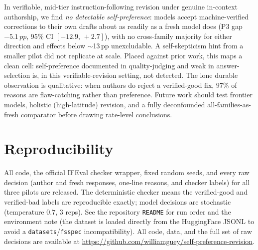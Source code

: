 \documentclass[11pt]{article}
\newcommand{\pp}{\,pp}
\newcommand{\CI}[2]{$[#1,\,#2]$}
\begin{document}
In verifiable, mid-tier instruction-following revision under genuine in-context authorship, we find
\emph{no detectable self-preference}: models accept machine-verified corrections to their own drafts
about as readily as a fresh model does (P3 gap $-5.1\pp$, 95\% CI \CI{-12.9}{+2.7}), with no
cross-family majority for either direction and effects below $\sim$13\pp{} unexcludable. A
self-skepticism hint from a smaller pilot did not replicate at scale. Placed against prior work, this
maps a clean cell: self-preference documented in quality-judging and weak in answer-selection is, in
this verifiable-revision setting, not detected. The lone durable observation is qualitative: when
authors do reject a verified-good fix, $97\%$ of reasons are flaw-catching rather than preference.
Future work should test frontier models, holistic (high-latitude) revision, and a fully deconfounded
all-families-as-fresh comparator before drawing rate-level conclusions.

\section*{Reproducibility}
All code, the official IFEval checker wrapper, fixed random seeds, and every raw decision (author and
fresh responses, one-line reasons, and checker labels) for all three pilots are released. The
deterministic checker means the verified-good and verified-bad labels are reproducible exactly;
model decisions are stochastic (temperature $0.7$, $3$ reps). See the repository \texttt{README}
for run order and the environment note (the dataset is loaded directly from the HuggingFace JSONL
to avoid a \texttt{datasets}/\texttt{fsspec} incompatibility). All code, data, and the full set of
raw decisions are available at \url{https://github.com/williamguey/self-preference-revision}.



\end{document}
